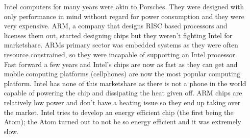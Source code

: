 \documentclass[10pt]{article}
\begin{document}
Intel computers for many years were akin to Porsches. They were designed with only performance in mind without regard for power consumption and they were very expensive. ARM, a company that designs RISC based processors and licenses them out, started designing chips but they weren't fighting Intel for marketshare. ARMs primary sector was embedded systems as they were often resource constrained, so they were incapable of supporting an Intel processor. Fast forward a few years and Intel's chips are now as fast as they can get and mobile computing platforms (cellphones) are now the most popular computing platform. Intel has none of this marketshare as there is not a phone in the world capable of powering the chip and dissipating the heat given off. ARM chips are relatively low power and don't have a heating issue so they end up taking over the market. Intel tries to develop an energy efficient chip (the first being the Atom); the Atom turned out to not be so energy efficient and it was extremely slow. 
\end{document}
